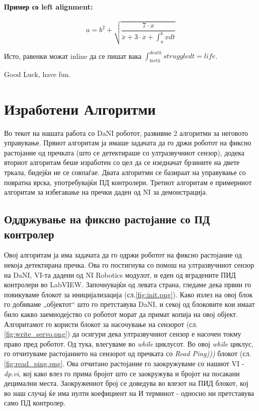 \documentclass{article}
\begin{document}
\paragraph{Пример со left alignment:}
\begin{flushleft}
$$ a = b^2 + \sqrt{\frac{7 \cdot x}{{\ddot x + 3 \cdot \dot x + \int_a^b{x dt}}}} $$
\end{flushleft}



Исто, равенки можат inline да се пишат вака $\int_{birth}^{death}{struggle dt} = life $.

Good Luck, have fun.
\newpage
\section{Изработени Алгоритми}
Во текот на нашата работа со DaNI роботот, развивме 2 алгоритми за неговото управување. Првиот алгоритам ја имаше задачата да го држи роботот на фиксно растојание од пречката (што се детектираше со ултразвучниот сензор), додека вториот алгоритам беше изработен со цел да се изедначат брзините на двете тркала, бидејќи не се совпаѓае. Двата алгоритми се базираат на управување со повратна врска, употребувајќи ПД контролери. Третиот алгоритам е примерниот алгоритам за избегавање на пречки даден од NI за демонстрација. 

\subsection{Оддржување на фиксно растојание со ПД контролер}
Овој алгоритам ја има задачата да го одржи роботот на фиксно растојание од некоја детектирана пречка. Ова го постигнува со помош на ултразвучниот сензор на DaNI, VI-та дадени од NI Robotics модулот, и еден од вградените ПИД контролери во LabVIEW. Започнувајќи од левата страна, гледаме дека првин го повикуваме блокот за иницијализација (сл.\ref{fig:init.png}). Како излез на овој блок го добиваме „објектот“ што го претставува DaNI, и секој од блоковите кои имаат било какво заемнодејство со роботот морат да примат копија на овој објект.
Алгоритамот го користи блокот за насочување на сензорот (сл.\ref{fig:write_servo.png}) да осигури дека ултразвучниот сензор е насочен токму право пред роботот. Од тука, влегуваме во \textit{while} циклусот. Во овој \textit{while} циклус, го отчитуваме растојанието на сензорот од пречката со \textit{Read Ping)))} блокот (сл.\ref{fig:read_ping.png}. Ова отчитано растојание го заокружуваме со нашиот VI - \textit{dp.vi}, кој како влез го прима бројот што се заокружува и бројот на посакани децимални места. Заокружениот број се доведува во влезот на ПИД блокот, кој во наш случај ќе има нулти коефициент на И терминот - односно ни претставува само ПД контролер.
\end{document}
